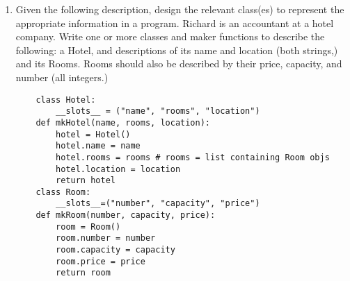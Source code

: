 \documentclass[11pt]{article}
\newenvironment{answer}{\large\lstset{basicstyle=\tiny\ttfamily}\color{white}}{}
\newenvironment{answer}{\large\lstset{basicstyle=\large\ttfamily}\color{red}}{}
\begin{document}
\begin{enumerate}
\begin{enumerate}
        \begin{answer}
        The issue is on line 6. Whenever \texttt{bad\_hash()} dictates that an element should be placed in an occupied bucket, that bucket's contents get overwritten! Change 
\begin{lstlisting}[numbers=none]
self.table[self.bad_hash(element)] = element 
\end{lstlisting} to 
\begin{lstlisting}[numbers=none]
self.table[self.bad_hash(element)].append(element)
\end{lstlisting}

        \end{answer}

    \item Draw the table of the properly behaving hash function.
        
        \begin{answer}
		\begin{lstlisting}[numbers=none]
[['wrestled', 'bear', 'once'], ['I', 'a'], [], []]
		\end{lstlisting}
    \end{answer}
\item Assuming that this hash table will only be used on strings, is the hashing function being used a good one? Why or why not?

    \begin{answer}
        No: It ignores the fact that most English words are the roughly the same length. The number of collisions is expected to be massive. We should take advantage of the characters in the input strings, not the number of characters.
    \end{answer}
    \end{enumerate}

\section*{Classes}

\item 
Given the following description, design the relevant class(es) to represent the appropriate information in a program. Richard is an accountant at a hotel company. Write one or more classes and maker functions to describe the following: a Hotel, and descriptions of its name and location (both strings,) and its Rooms. Rooms should also be described by their price, capacity, and number (all integers.)

	\small
	\begin{answer}
	\begin{lstlisting}
	class Hotel:
		__slots__ = ("name", "rooms", "location")
	def mkHotel(name, rooms, location):
		hotel = Hotel()
		hotel.name = name
		hotel.rooms = rooms # rooms = list containing Room objs
		hotel.location = location
		return hotel
	class Room:
		__slots__=("number", "capacity", "price")
	def mkRoom(number, capacity, price):
		room = Room()
		room.number = number
		room.capacity = capacity
		room.price = price
		return room
	\end{lstlisting}
	\end{answer}
	\normalsize


\end{enumerate}
\end{document}
